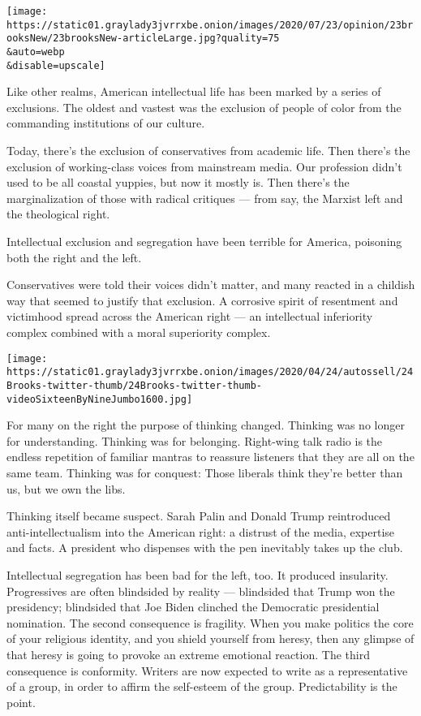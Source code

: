 \texttt{[image: https://static01.graylady3jvrrxbe.onion/images/2020/07/23/opinion/23brooksNew/23brooksNew-articleLarge.jpg?quality=75\\\&auto=webp\\\&disable=upscale]}

Like other realms, American intellectual life has been marked by a
series of exclusions. The oldest and vastest was the exclusion of people
of color from the commanding institutions of our culture.

Today, there's the exclusion of conservatives from academic life. Then
there's the exclusion of working-class voices from mainstream media. Our
profession didn't used to be all coastal yuppies, but now it mostly is.
Then there's the marginalization of those with radical critiques ---
from say, the Marxist left and the theological right.

Intellectual exclusion and segregation have been terrible for America,
poisoning both the right and the left.

Conservatives were told their voices didn't matter, and many reacted in
a childish way that seemed to justify that exclusion. A corrosive spirit
of resentment and victimhood spread across the American right --- an
intellectual inferiority complex combined with a moral superiority
complex.

\texttt{[image: https://static01.graylady3jvrrxbe.onion/images/2020/04/24/autossell/24Brooks-twitter-thumb/24Brooks-twitter-thumb-videoSixteenByNineJumbo1600.jpg]}

For many on the right the purpose of thinking changed. Thinking was no
longer for understanding. Thinking was for belonging. Right-wing talk
radio is the endless repetition of familiar mantras to reassure
listeners that they are all on the same team. Thinking was for conquest:
Those liberals think they're better than us, but we own the libs.

Thinking itself became suspect. Sarah Palin and Donald Trump
reintroduced anti-intellectualism into the American right: a distrust of
the media, expertise and facts. A president who dispenses with the pen
inevitably takes up the club.

Intellectual segregation has been bad for the left, too. It produced
insularity. Progressives are often blindsided by reality --- blindsided
that Trump won the presidency; blindsided that Joe Biden clinched the
Democratic presidential nomination. The second consequence is fragility.
When you make politics the core of your religious identity, and you
shield yourself from heresy, then any glimpse of that heresy is going to
provoke an extreme emotional reaction. The third consequence is
conformity. Writers are now expected to write as a representative of a
group, in order to affirm the self-esteem of the group. Predictability
is the point.

